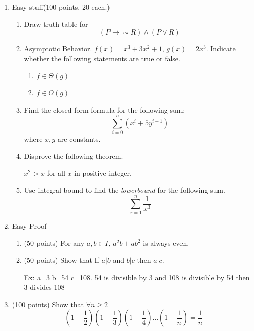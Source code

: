 \documentclass[a4paper, 12pt, addpoints]{exam}
\newcommand{\manswer}{\vspace{2.5in}}
\newcommand{\ssanswer}{\vspace{0.5in}}
\begin{document}
\begin{enumerate}
	\setlength\itemsep{1em}
	\item Easy stuff(100 points. 20 each.)
	
	\begin{enumerate}
		\item Draw truth table for 
		\[ (P \to \sim R) \land (P \lor R) \]
			\manswer
			
		
		\item Asymptotic Behavior. $f(x) = x^3 + 3x^2 + 1$, $g(x) = 2x^3$. Indicate whether the following statements are true or false.
		\begin{enumerate}
			\item  $f \in \Theta(g)$ 
			\ssanswer
			
			\item $f \in O(g)$
			\ssanswer

		\end{enumerate}

		\item Find the closed form formula for the following sum:
		\[ \sum_{i=0}^n (x^i + 5y^{i+1}) \]
		where $x, y$ are constants.
		\manswer
		\newpage
		\item Disprove the following theorem.
		\begin{center}
			$x^2 > x$ for all $x$ in positive integer.
		\end{center}
		\manswer
		\item Use integral bound to find the \emph{lowerbound} for the following sum.\[
			\sum^n_{x=1} \frac{1}{x^3}
		\]\manswer
	\end{enumerate}
	\newpage
	
	\item Easy Proof
	\begin{enumerate}
		\item (50 points)
		For any $a, b \in I$,  $a^2b + ab^2$ is always even.
		\manswer
		
		\item (50 points)
		Show that If $a|b$ and $b|c$ then $a|c$.
		
		Ex: a=3 b=54 c=108. 54 is divisible by 3 and 108 is divisible by 54 then 3 divides 108
		\manswer
		

	\end{enumerate}
	
	\newpage
	\newcommand{\ff}[1]{\left(1-\frac{1}{#1}\right)}
	\item (100 points) Show that $\forall n \ge 2$
	$$
	\ff{2}\ff{3}\ff{4}\ldots\ff{n} =  \frac{1}{n}
	$$
	

\end{enumerate}
\end{document}
